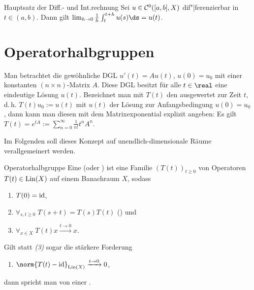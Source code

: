 \begin{Satz}{Hauptsatz der Diff.- und Int.rechnung}
    Sei $u \in \mathcal{C}^0([a, b], X)$ dif"|ferenzierbar in\\
    $t \in (a, b)$.
    Dann gilt $\lim_{h \to 0} \frac{1}{h} \int_t^{t+h} u(s)\ds = u(t)$.
\end{Satz}

\section{%
    Operatorhalbgruppen%
}

\begin{Bem}
    Man betrachtet die gewöhnliche DGL $u'(t) = Au(t)$, $u(0) = u_0$
    mit einer konstanten $(n \times n)$-Matrix $A$.
    Diese DGL besitzt für alle $t \in \real$ eine eindeutige Lösung $u(t)$.
    Bezeichnet man mit $T(t)$ den  ausgewertet zur Zeit $t$,
    d.\,h. $T(t)u_0 := u(t)$ mit $u(t)$ der Lösung zur Anfangsbedingung $u(0) = u_0$,
    dann kann man diesen mit dem Matrixexponential explizit angeben:
    Es gilt $T(t) = e^{tA} := \sum_{n=0}^\infty \frac{1}{n!} t^n A^n$.

    Im Folgenden soll dieses Konzept auf unendlich-dimensionale Räume verallgemeinert werden.
\end{Bem}

\linie

\begin{Def}{Operatorhalbgruppe}
    Eine  (oder ) ist eine
    Familie $(T(t))_{t \ge 0}$ von Operatoren $T(t) \in \operatorname{Lin}(X)$ auf einem Banachraum $X$, sodass
    \begin{enumerate}
        \item
        $T(0) = \text{id}$,

        \item
        $\forall_{s, t \ge 0}\; T(s+t) = T(s) T(t)$
        () und

        \item
        $\forall_{x \in X}\; T(t) x \xrightarrow{t \to 0} x$.
    \end{enumerate}
    Gilt statt \emph{(3)} sogar die stärkere Forderung
    \begin{enumerate}[label=\emph{(\arabic*')},start=3]
        \item
        $\norm{T(t) - \id}_{\Lin(X)} \xrightarrow{t \to 0} 0$,
    \end{enumerate}
    dann spricht man von einer .
\end{Def}


